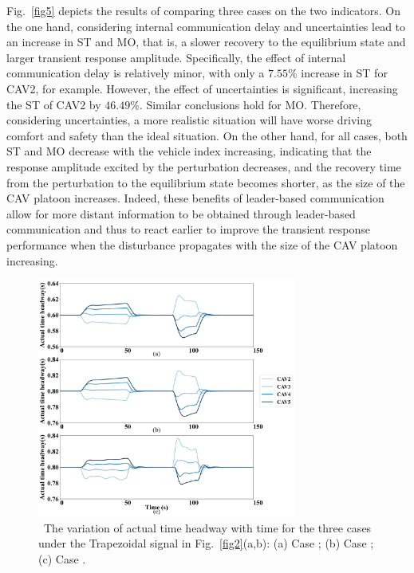 \documentclass[journal]{IEEEtran}
\begin{document}
Fig.~\ref{fig5} depicts the results of comparing three cases on the two indicators. On the one hand, considering internal communication delay and uncertainties lead to an increase in ST and MO, that is, a slower recovery to the equilibrium state and larger transient response amplitude. Specifically, the effect of internal communication delay is relatively minor, with only a $7.55\%$ increase in ST for CAV2, for example. However, the effect of uncertainties is significant, increasing the ST of CAV2 by $46.49\%$. Similar conclusions hold for MO. Therefore, considering uncertainties, a more realistic situation will have worse driving comfort and safety than the ideal situation. On the other hand, for all cases, both ST and MO decrease with the vehicle index increasing, indicating that the response amplitude excited by the perturbation decreases, and the recovery time from the perturbation to the equilibrium state becomes shorter, as the size of the CAV platoon increases. Indeed, these benefits of leader-based communication allow for more distant information to be obtained through leader-based communication and thus to react earlier to improve the transient response performance when the disturbance propagates with the size of the CAV platoon increasing.


\begin{figure}
  \centering
  \includegraphics[width=8.5cm]{figs/fig6.png}
  \caption{~The variation of actual time headway with time for the three cases under the Trapezoidal signal in Fig.~\ref{fig2}(a,b): (a) Case \uppercase\expandafter{}; (b) Case \uppercase\expandafter{}; (c) Case \uppercase\expandafter{}.}
  \label{fig6}
\end{figure}
\end{document}
